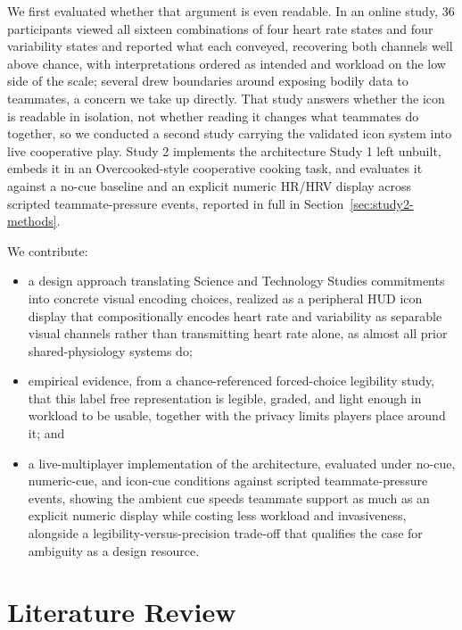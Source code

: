 \documentclass[manuscript,review,anonymous]{acmart}
\begin{document}
We first evaluated whether that argument is even readable. In an online study, 36 participants viewed all sixteen combinations of four heart rate states and four variability states and reported what each conveyed, recovering both channels well above chance, with interpretations ordered as intended and workload on the low side of the scale; several drew boundaries around exposing bodily data to teammates, a concern we take up directly. That study answers whether the icon is readable in isolation, not whether reading it changes what teammates do together, so we conducted a second study carrying the validated icon system into live cooperative play. Study 2 implements the architecture Study 1 left unbuilt, embeds it in an Overcooked-style \cite{carroll_utility_2019, baek_toward_2022} cooperative cooking task, and evaluates it against a no-cue baseline and an explicit numeric HR/HRV display across scripted teammate-pressure events, reported in full in Section~\ref{sec:study2-methods}.

We contribute:
\begin{itemize}
    \item a design approach translating Science and Technology Studies commitments into concrete visual encoding choices, realized as a peripheral HUD icon display that compositionally encodes heart rate and variability as separable visual channels rather than transmitting heart rate alone, as almost all prior shared-physiology systems do;
    \item empirical evidence, from a chance-referenced forced-choice legibility study, that this label free representation is legible, graded, and light enough in workload to be usable, together with the privacy limits players place around it; and
    \item a live-multiplayer implementation of the architecture, evaluated under no-cue, numeric-cue, and icon-cue conditions against scripted teammate-pressure events, showing the ambient cue speeds teammate support as much as an explicit numeric display while costing less workload and invasiveness, alongside a legibility-versus-precision trade-off that qualifies the case for ambiguity as a design resource.
\end{itemize}

\section{Literature Review}
\end{document}

